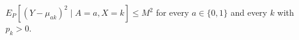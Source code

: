 \(E_P[(Y-\mu_{ak})^2\mid A=a,X=k]\le M^2\) for every \(a\in\{0,1\}\) and every \(k\) with \(p_k>0\).